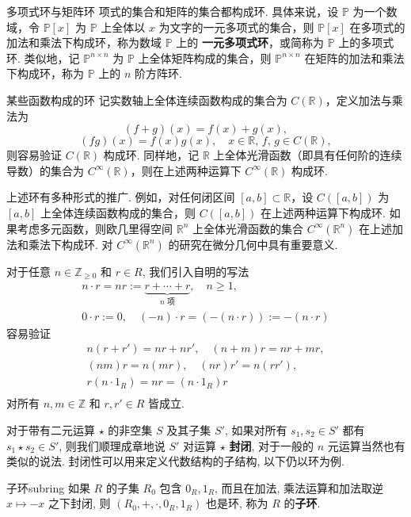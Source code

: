 \documentclass[12pt, a4paper]{ctexart}
\begin{document}
\begin{example}{多项式环与矩阵环}{}
	项式的集合和矩阵的集合都构成环. 具体来说，设 $\mathbb{P}$ 为一个数域，令 $\mathbb{P}[x]$ 为 $\mathbb{P}$ 上全体以 $x$ 为文字的一元多项式的集合，则 $\mathbb{P}[x]$ 在多项式的加法和乘法下构成环，称为数域 $\mathbb{P}$ 上的 \textbf{一元多项式环}，或简称为 $\mathbb{P}$ 上的多项式环. 类似地，记 $\mathbb{P}^{n \times n}$ 为 $\mathbb{P}$ 上全体矩阵构成的集合，则 $\mathbb{P}^{n \times n}$ 在矩阵的加法和乘法下构成环，称为 $\mathbb{P}$ 上的 $n$ 阶方阵环. 
\end{example}
\begin{example}{某些函数构成的环}{}
	记实数轴上全体连续函数构成的集合为 $C(\mathbb{R})$，定义加法与乘法为
	\[
	(f + g)(x) = f(x) + g(x),
	\]
	\[
	(fg)(x) = f(x)g(x), \quad x \in \mathbb{R}, \, f, \, g \in C(\mathbb{R}),
	\]
	则容易验证 $C(\mathbb{R})$ 构成环. 同样地，记 $\mathbb{R}$ 上全体光滑函数（即具有任何阶的连续导数）的集合为 $C^{\infty}(\mathbb{R})$，则在上述两种运算下 $C^{\infty}(\mathbb{R})$ 构成环. 
	
	上述环有多种形式的推广. 例如，对任何闭区间 $[a, b] \subset \mathbb{R}$，设 $C([a, b])$ 为 $[a, b]$ 上全体连续函数构成的集合，则 $C([a, b])$ 在上述两种运算下构成环. 如果考虑多元函数，则欧几里得空间 $\mathbb{R}^n$ 上全体光滑函数的集合 $C^{\infty}(\mathbb{R}^n)$ 在上述加法和乘法下构成环. 对 $C^{\infty}(\mathbb{R}^n)$ 的研究在微分几何中具有重要意义. 
\end{example}
	对于任意 $n \in \mathbb{Z}_{\geqslant 0}$ 和 $r \in R$, 我们引入自明的写法\begin{equation}
		\begin{aligned}
			n \cdot r = nr := \underbrace{r + \cdots + r}_{n \text{ 项}}, \quad n \geqslant 1,\\0 \cdot r := 0, \quad (-n) \cdot r = (-(n \cdot r)) := -(n \cdot r)
		\end{aligned}
	\end{equation}
容易验证\begin{equation}
	\begin{aligned}
		n(r + r') = nr + nr', \quad (n + m)r = nr + mr,\\
		(nm)r = n(mr), \quad (nr)r' = n(rr'),\\
		r(n \cdot 1_R) = nr = (n \cdot 1_R)r\\
	\end{aligned}
\end{equation}
对所有 $n, m \in \mathbb{Z}$ 和 $r, r' \in R$ 皆成立. 

对于带有二元运算 $\star$ 的非空集 $S$ 及其子集 $S'$, 如果对所有 $s_1, s_2 \in S'$ 都有 $s_1 \star s_2 \in S'$, 则我们顺理成章地说 $S'$ 对运算 $\star$ \textbf{封闭}, 对于一般的 $n$ 元运算当然也有类似的说法. 封闭性可以用来定义代数结构的子结构, 以下仍以环为例.
\begin{definition}{子环}{subring}
	如果 $R$ 的子集 $R_0$ 包含 $0_R, 1_R$, 而且在加法, 乘法运算和加法取逆 $x \mapsto -x$ 之下封闭, 则 $(R_0, +, \cdot, 0_R, 1_R)$ 也是环, 称为 $R$ 的\textbf{子环}.
\end{definition}
\end{document}
